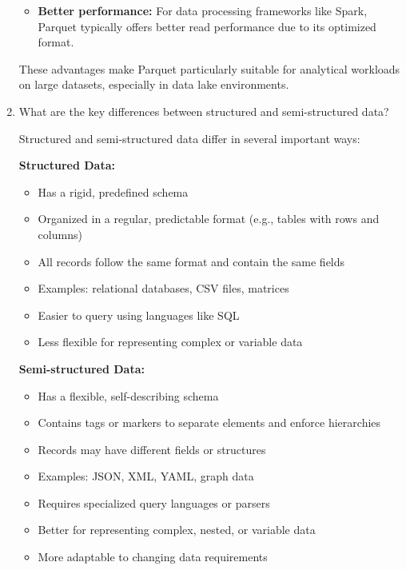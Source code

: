 \documentclass[12pt]{article}
\begin{document}
\begin{enumerate}
\begin{tcolorbox}[colback=blue!5!white,colframe=blue!75!black,title=Solution]
\begin{itemize}
        \item \textbf{Better performance:} For data processing frameworks like Spark, Parquet typically offers better read performance due to its optimized format.
    \end{itemize}
    
    These advantages make Parquet particularly suitable for analytical workloads on large datasets, especially in data lake environments.
    \end{tcolorbox}
    
    \item What are the key differences between structured and semi-structured data?
    
    \begin{tcolorbox}[colback=blue!5!white,colframe=blue!75!black,title=Solution]
    Structured and semi-structured data differ in several important ways:
    
    \textbf{Structured Data:}
    \begin{itemize}
        \item Has a rigid, predefined schema
        \item Organized in a regular, predictable format (e.g., tables with rows and columns)
        \item All records follow the same format and contain the same fields
        \item Examples: relational databases, CSV files, matrices
        \item Easier to query using languages like SQL
        \item Less flexible for representing complex or variable data
    \end{itemize}
    
    \textbf{Semi-structured Data:}
    \begin{itemize}
        \item Has a flexible, self-describing schema
        \item Contains tags or markers to separate elements and enforce hierarchies
        \item Records may have different fields or structures
        \item Examples: JSON, XML, YAML, graph data
        \item Requires specialized query languages or parsers
        \item Better for representing complex, nested, or variable data
        \item More adaptable to changing data requirements
    \end{itemize}
    

\end{tcolorbox}
\end{enumerate}
\end{document}
